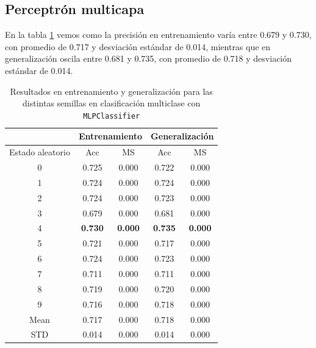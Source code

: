 \newpage
\subsection{Perceptrón multicapa}
\label{subsec:mlp_multi}

En la tabla \ref{tabla:mlp_multi} vemos como la precisión en entrenamiento varía entre 0.679 y 0.730, con promedio de 0.717 y desviación estándar de 0.014, mientras que en generalización oscila entre 0.681 y 0.735, con promedio de 0.718 y desviación estándar de 0.014.

\begin{table}[H]
	\centering
	\begin{tabular}{ |c|c|c|c|c| }
		\hline
		\rowcolor{LightCyan}
		 & \multicolumn{2}{c|}{Entrenamiento} & \multicolumn{2}{c|}{Generalización} \\
		\hline
		\rowcolor{LightCyan}
		 Estado aleatorio & Acc & MS & Acc & MS \\
		\hline
		0    & 0.725          & 0.000          & 0.722          & 0.000          \\
		1    & 0.724          & 0.000          & 0.724          & 0.000          \\
		2    & 0.724          & 0.000          & 0.723          & 0.000          \\
		3    & 0.679          & 0.000          & 0.681          & 0.000          \\
		4    & \textbf{0.730} & \textbf{0.000} & \textbf{0.735} & \textbf{0.000} \\
		5    & 0.721          & 0.000          & 0.717          & 0.000          \\
		6    & 0.724          & 0.000          & 0.723          & 0.000          \\
		7    & 0.711          & 0.000          & 0.711          & 0.000          \\
		8    & 0.719          & 0.000          & 0.720          & 0.000          \\
		9    & 0.716          & 0.000          & 0.718          & 0.000          \\
		Mean & 0.717          & 0.000          & 0.718          & 0.000          \\
		STD  & 0.014          & 0.000          & 0.014          & 0.000          \\
		\hline
	\end{tabular}
	\caption{Resultados en entrenamiento y generalización para las distintas semillas en clasificación multiclase con \texttt{MLPClassifier}}
	\label{tabla:mlp_multi}
\end{table}

